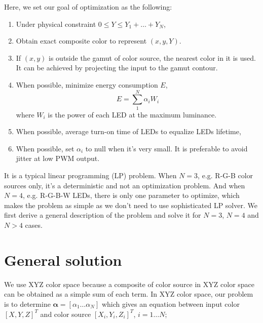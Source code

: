 \documentclass[dvipdfmx,uplatex,a4paper]{article}
\begin{document}
Here, we set our goal of optimization as the following:
\begin{enumerate}
  \item\label{I_max_luminance} Under physical constraint $0 \leq Y \leq  Y_1 + \ldots + Y_N$,
  \item\label{I_solution} Obtain exact composite color to represent $(x, y, Y)$.
  \item\label{I_inside_gamut} If $(x, y)$ is outside the gamut of color source, the nearest color in it is used.
  It can be achieved by projecting the input to the gamut contour.
  \item\label{I_min_energy} When possible, minimize energy consumption $E$, \\
  \begin{equation}
    \label{E_min_energy}
    E = \sum_1^N \alpha_i W_i
  \end{equation}
  where $W_i$ is the power of each LED at the maximum luminance.
  \item\label{I_lifetime} When possible, average turn-on time of LEDs to equalize LEDs lifetime,
  \item\label{I_small_alpha} When possible, set $\alpha_i$ to null when it's very small.
  It is preferable to avoid jitter at low PWM output.
\end{enumerate}

It is a typical linear programming (LP) problem. When $N=3$, e.g. R-G-B color sources only, it's a deterministic and not an optimization problem. And when $N=4$, e.g. R-G-B-W LEDs, there is only one parameter to optimize, which makes the problem as simple as we don't need to use sophisticated LP solver.
We first derive a general description of the problem and solve it for $N=3$, $N=4$ and $N > 4$ cases.

\section{General solution}
We use XYZ color space because a composite of color source in XYZ color space can be obtained as a simple sum of each term.  In XYZ color space, our problem is to determine $\boldsymbol{\alpha} = [\alpha_1 \ldots \alpha_N]$ which gives an equation between input color $[X, Y, Z]^T$ and color source $[X_{i}, Y_{i}, Z_{i}]^T$, $i=1 \ldots N$;
\end{document}
